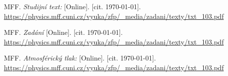
\begin{thebibliography}{9}
 MFF. \emph{Studijní text:} [Online]. [cit. \today]. \newline \url{https://physics.mff.cuni.cz/vyuka/zfp/_media/zadani/texty/txt_103.pdf}

 MFF. \emph{Zadání} [Online]. [cit. \today]. \newline \url{https://physics.mff.cuni.cz/vyuka/zfp/_media/zadani/texty/txt_103.pdf}

 MFF. \emph{Atmosférický tlak:} [Online]. [cit. \today]. \newline \url{https://physics.mff.cuni.cz/vyuka/zfp/_media/zadani/texty/txt_103.pdf}

\end{thebibliography}
